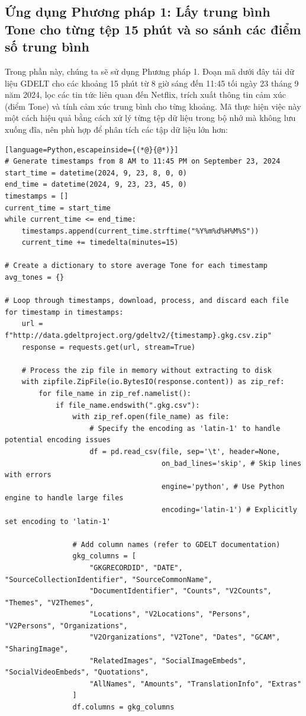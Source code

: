 \subsection{Ứng dụng Phương pháp 1: Lấy trung bình Tone cho từng tệp 15 phút và so sánh các điểm số trung bình}

Trong phần này, chúng ta sẽ sử dụng Phương pháp 1. Đoạn mã dưới đây tải dữ liệu GDELT cho các khoảng 15 phút từ 8 giờ sáng đến 11:45 tối ngày 23 tháng 9 năm 2024, lọc các tin tức liên quan đến Netflix, trích xuất thông tin cảm xúc (điểm Tone) và tính cảm xúc trung bình cho từng khoảng. Mã thực hiện việc này một cách hiệu quả bằng cách xử lý từng tệp dữ liệu trong bộ nhớ mà không lưu xuống đĩa, nên phù hợp để phân tích các tập dữ liệu lớn hơn:

\begin{lstlisting}[language=Python,escapeinside={(*@}{@*)}]
# Generate timestamps from 8 AM to 11:45 PM on September 23, 2024
start_time = datetime(2024, 9, 23, 8, 0, 0)
end_time = datetime(2024, 9, 23, 23, 45, 0)
timestamps = []
current_time = start_time
while current_time <= end_time:
    timestamps.append(current_time.strftime("%Y%m%d%H%M%S"))
    current_time += timedelta(minutes=15)

# Create a dictionary to store average Tone for each timestamp
avg_tones = {}

# Loop through timestamps, download, process, and discard each file
for timestamp in timestamps:
    url = f"http://data.gdeltproject.org/gdeltv2/{timestamp}.gkg.csv.zip"
    response = requests.get(url, stream=True)

    # Process the zip file in memory without extracting to disk
    with zipfile.ZipFile(io.BytesIO(response.content)) as zip_ref:
        for file_name in zip_ref.namelist():
            if file_name.endswith(".gkg.csv"):
                with zip_ref.open(file_name) as file:
                    # Specify the encoding as 'latin-1' to handle potential encoding issues
                    df = pd.read_csv(file, sep='\t', header=None,
                                     on_bad_lines='skip', # Skip lines with errors
                                     engine='python', # Use Python engine to handle large files
                                     encoding='latin-1') # Explicitly set encoding to 'latin-1'

                # Add column names (refer to GDELT documentation)
                gkg_columns = [
                    "GKGRECORDID", "DATE", "SourceCollectionIdentifier", "SourceCommonName",
                    "DocumentIdentifier", "Counts", "V2Counts", "Themes", "V2Themes",
                    "Locations", "V2Locations", "Persons", "V2Persons", "Organizations",
                    "V2Organizations", "V2Tone", "Dates", "GCAM", "SharingImage",
                    "RelatedImages", "SocialImageEmbeds", "SocialVideoEmbeds", "Quotations",
                    "AllNames", "Amounts", "TranslationInfo", "Extras"
                ]
                df.columns = gkg_columns


\end{lstlisting}
